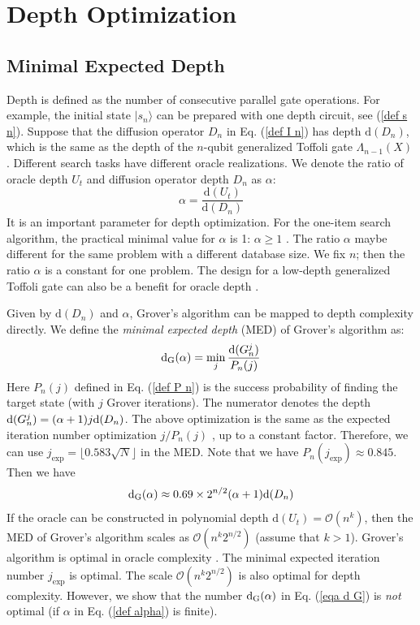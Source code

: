 \documentclass[%
 twocolumn,
 10pt,
 superscriptaddress,
 longbibliography,
 amsmath,amssymb,
 aps,
 pra,
floatfix,
]{revtex4-1}
\newcommand{\eq}{\begin{equation}}
\newcommand{\en}{\end{equation}}
\begin{document}
\section{\label{sec:dep_opt}Depth Optimization}

\subsection{\label{subsec:MED}Minimal Expected Depth}

Depth is defined as the number of consecutive parallel gate operations. For example, the initial state $|s_n\rangle$ can be prepared with one depth circuit, see (\ref{def s n}). Suppose that the diffusion operator $D_n$ in Eq. (\ref{def I n}) has depth $\text{d}(D_n)$, which is the same as the depth of the $n$-qubit generalized Toffoli gate $\Lambda_{n-1}(X)$ \cite{NC10}. Different search tasks have different oracle realizations. We denote the ratio of  oracle depth $U_t$ and diffusion operator depth $D_n$ as $\alpha$:
\eq
\label{def alpha}
\alpha = \frac{\text{d}(U_t)}{\text{d}(D_n)}
\en
It is an important parameter for depth optimization. For the one-item search algorithm, the practical minimal value for $\alpha$ is 1: $\alpha\geq1$ \cite{FMLLDM17}. The ratio $\alpha$ maybe different for the same problem with a different database size. We fix $n$; then the ratio $\alpha$ is a constant for one problem. The design for a low-depth generalized Toffoli gate can also be a benefit for oracle depth \cite{GBDBRC19}. 

Given by $\text{d}(D_n)$ and $\alpha$, Grover's algorithm can be mapped to depth complexity directly. We define the \textit{minimal expected depth} (MED) of Grover's algorithm as:
\begin{equation}
  \label{def d G}
  \text d_\text{G}(\alpha) = \min_j \frac{\text d(G_n^j)}{P_n(j)}
\end{equation}
Here $P_n(j)$ defined in Eq. (\ref{def P n}) is the success probability of finding the target state (with $j$ Grover iterations). The numerator denotes the depth $\text d(G_n^j)=(\alpha+1)j\text d(D_n)$. The above optimization is the same as the expected iteration number optimization $j/P_n(j)$ \cite{BBHT98,GWC00}, up to a constant factor. Therefore, we can use $j_\text{exp}=\lfloor 0.583\sqrt N \rfloor$ in the MED. Note that we have $P_n(j_\text{exp})\approx 0.845$. Then we have
\begin{equation}
    \label{eqa d G}
    \text d_\text{G}(\alpha) \approx 0.69\times 2^{n/2}(\alpha+1)\text d(D_n)
\end{equation}
If the oracle can be constructed in polynomial depth $\text{d}(U_t)=\mathcal O(n^k)$, then the MED of Grover's algorithm scales as $\mathcal O(n^{k}2^{n/2})$ (assume that $k>1$). Grover's algorithm is optimal in oracle complexity \cite{BBHT98,Zalka99}. The minimal expected iteration number $j_\text{exp}$ is optimal. The scale $\mathcal O(n^{k}2^{n/2})$ is also optimal for depth complexity. However, we show that the number $\text d_\text{G}(\alpha)$ in Eq. (\ref{eqa d G}) is {\it not} optimal (if $\alpha$ in Eq. (\ref{def alpha}) is finite).
\end{document}

